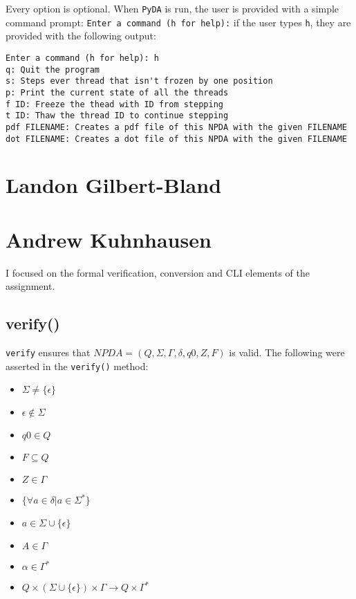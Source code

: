 \documentclass[a4paper]{article}
\begin{document}
Every option is optional. When \texttt{PyDA} is run, the user is provided with a
simple command prompt: \texttt{Enter a command (h for help):} if the user types
\texttt{h}, they are provided with the following output:
\begin{verbatim}
Enter a command (h for help): h
q: Quit the program
s: Steps ever thread that isn't frozen by one position
p: Print the current state of all the threads
f ID: Freeze the thead with ID from stepping
t ID: Thaw the thread ID to continue stepping
pdf FILENAME: Creates a pdf file of this NPDA with the given FILENAME
dot FILENAME: Creates a dot file of this NPDA with the given FILENAME
\end{verbatim}

\section{Landon Gilbert-Bland}
\section{Andrew Kuhnhausen}
I focused on the formal verification, conversion and CLI elements of the
assignment.
\subsection{verify()}
\texttt{verify} ensures that $NPDA=(Q,\Sigma,\Gamma,\delta,q0,Z,F)$ is valid.
The following were asserted in the \texttt{verify()} method:
\begin{itemize}
    \item $\Sigma \ne \{\epsilon\}$
    \item $\epsilon \notin \Sigma$
    \item $q0\in Q$
    \item $F \subseteq Q$
    \item $Z \in \Gamma$
    \item $\{\forall a \in \delta | a \in \Sigma^{*}\}$
    \item $a\in\Sigma\cup\{\epsilon\}$
    \item $A\in\Gamma$
    \item $\alpha\in\Gamma^{*}$
    \item $Q\times(\Sigma\cup\{\epsilon\})\times\Gamma\rightarrow Q\times\Gamma^{*}$
\end{itemize}
\end{document}
